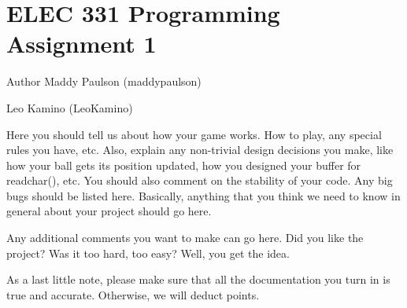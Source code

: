 \chapter{ELEC 331 Programming Assignment 1}
\hypertarget{index}{}\label{index}
\begin{DoxyAuthor}{Author}
Maddy Paulson (maddypaulson) 

Leo Kamino (Leo\+Kamino)
\end{DoxyAuthor}
Here you should tell us about how your game works. How to play, any special rules you have, etc. Also, explain any non-\/trivial design decisions you make, like how your ball gets its position updated, how you designed your buffer for readchar(), etc. You should also comment on the stability of your code. Any big bugs should be listed here. Basically, anything that you think we need to know in general about your project should go here.

Any additional comments you want to make can go here. Did you like the project? Was it too hard, too easy? Well, you get the idea.

As a last little note, please make sure that all the documentation you turn in is true and accurate. Otherwise, we will deduct points. 